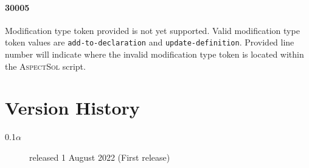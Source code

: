 \documentclass{article}
\newcommand{\AspectSol}{\textsc{AspectSol}\xspace}
\begin{document}
\paragraph{30005} Modification type token provided is not yet supported. Valid modification type token values are \texttt{add-to-declaration} and \texttt{update-definition}. Provided line number will indicate where the invalid modification type token is located within the \AspectSol script.
	
	
\section{Version History}

\begin{description}
	\item[0.1$\alpha$] released 1 August 2022 (First release)
\end{description}
	
\end{document}
